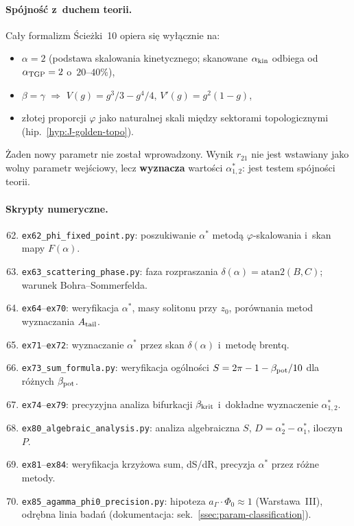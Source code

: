 \paragraph{Spójność z~duchem teorii.}
Cały formalizm Ścieżki~10 opiera się wyłącznie na:
\begin{itemize}[nosep]
  \item[$N0$-2] $\alpha = 2$ (podstawa skalowania kinetycznego;
    skanowane $\alpha_{\rm kin}$ odbiega od $\alpha_{\rm TGP}=2$ o~$20$--$40\%$),
  \item[$N0$-5] $\beta = \gamma$ $\Rightarrow$ $V(g) = g^3/3 - g^4/4$,
    $V'(g) = g^2(1-g)$,
  \item złotej proporcji $\varphi$ jako naturalnej skali między sektorami
    topologicznymi (hip.~\ref{hyp:J-golden-topo}).
\end{itemize}
Żaden nowy parametr nie został wprowadzony.
Wynik $r_{21}$ nie jest wstawiany jako wolny parametr wejściowy,
lecz \textbf{wyznacza} wartości $\alpha^*_{1,2}$: jest testem spójności teorii.

\paragraph{Skrypty numeryczne.}
\begin{enumerate}[nosep,label=\textbf{ex\arabic*.}]
  \setcounter{enumi}{61}
  \item \texttt{ex62\_phi\_fixed\_point.py}: poszukiwanie $\alpha^*$
    metodą $\varphi$-skalowania i~skan mapy $F(\alpha)$.
  \item \texttt{ex63\_scattering\_phase.py}: faza rozpraszania
    $\delta(\alpha) = \mathrm{atan2}(B, C)$; warunek Bohra--Sommerfelda.
  \item \texttt{ex64}--\texttt{ex70}: weryfikacja $\alpha^*$, masy
    solitonu przy $z_0$, porównania metod wyznaczania $A_{\rm tail}$.
  \item \texttt{ex71}--\texttt{ex72}: wyznaczanie $\alpha^*$ przez
    skan $\delta(\alpha)$ i~metodę brentq.
  \item \texttt{ex73\_sum\_formula.py}: weryfikacja ogólności
    $S = 2\pi - 1 - \beta_{\rm pot}/10$ dla różnych $\beta_{\rm pot}$.
  \item \texttt{ex74}--\texttt{ex79}: precyzyjna analiza bifurkacji
    $\beta_{\rm krit}$ i~dokładne wyznaczenie $\alpha^*_{1,2}$.
  \item \texttt{ex80\_algebraic\_analysis.py}: analiza algebraiczna
    $S$, $D = \alpha^*_2 - \alpha^*_1$, iloczyn~$P$.
  \item \texttt{ex81}--\texttt{ex84}: weryfikacja krzyżowa sum,
    dS/dR, precyzja $\alpha^*$ przez różne metody.
  \item \texttt{ex85\_agamma\_phi0\_precision.py}: hipoteza
    $a_\Gamma \cdot \Phi_0 \approx 1$ (Warstawa~III), odrębna linia badań
    (dokumentacja: sek.~\ref{ssec:param-classification}).
\end{enumerate}
